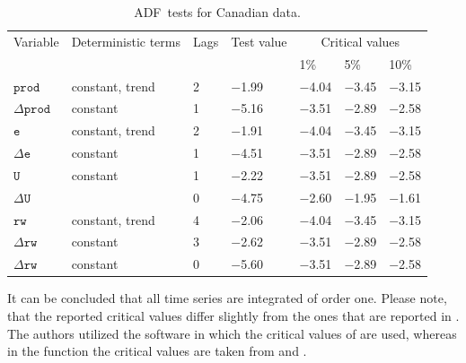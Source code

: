 \documentclass[nojss]{jss}
\begin{document}
\begin{table}
\begin{center}
\begin{tabular}{@{}lllllll@{}}
\toprule
\multicolumn{1}{l}{Variable}&
\multicolumn{1}{l}{Deterministic terms}&
\multicolumn{1}{l}{Lags}&
\multicolumn{1}{l}{Test value} &
\multicolumn{3}{c}{Critical values}
\\
\cmidrule(l){5-7}
& & & & 1\% & 5\% & 10\%\\
\midrule    
$\mathtt{prod}$ & constant, trend & 2 & $-$1.99 &
$-$4.04 & $-$3.45 & $-$3.15\\ 
$\varDelta \mathtt{prod}$ & constant & 1 & $-$5.16 &
$-$3.51 & $-$2.89 & $-$2.58\\ 
$\mathtt{e}$ & constant, trend & 2 & $-$1.91 &
$-$4.04 & $-$3.45 & $-$3.15\\ 
$\varDelta \mathtt{e}$ & constant & 1 & $-$4.51 &
$-$3.51 & $-$2.89 & $-$2.58\\ 
$\mathtt{U}$ & constant & 1 & $-$2.22 &
$-$3.51 & $-$2.89 & $-$2.58\\ 
$\varDelta \mathtt{U}$ & & 0 & $-$4.75 &
$-$2.60 &
$-$1.95 & $-$1.61\\  
$\mathtt{rw}$ & constant, trend & 4 & $-$2.06 &
$-$4.04 & $-$3.45 & $-$3.15\\ 
$\varDelta \mathtt{rw}$ & constant & 3 & $-$2.62 &
$-$3.51 & $-$2.89 & $-$2.58\\ 
$\varDelta \mathtt{rw}$ & constant & 0 & 
$-$5.60 &
$-$3.51 & $-$2.89 & $-$2.58\\ 
\bottomrule
\end{tabular}
\end{center}
\caption{ADF~tests for Canadian data.}
\label{tab-2}
\end{table}
It can be concluded that all time series are integrated of order
one. Please note, that the reported critical values differ slightly
from the ones that are reported in \citet{BRE2004}. The authors
utilized the software  \citep{LUE2004} in which the
critical values of \cite{DAV1993} are used, whereas in the function
 the critical values are taken from \citet{DIC1981} and
\citet{HAM1994}.
\end{document}
